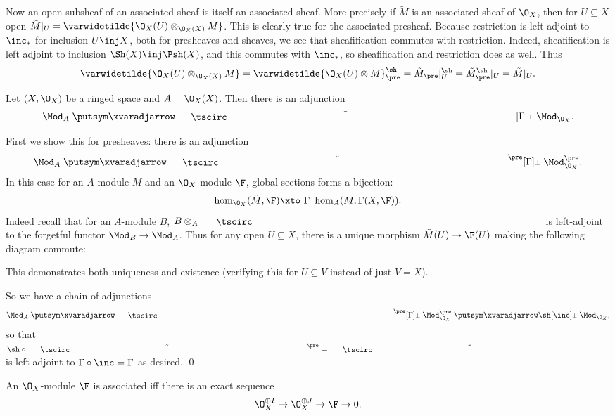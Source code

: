 Now an open subsheaf of an associated sheaf is itself an associated sheaf.
More precisely if $\tilde M$ is an associated sheaf of $\O_X$, then for $U\subseteq X$ open $\tilde M|_U=\varwidetilde{\O_X(U)\otimes_{\O_X(X)}M}$.
This is clearly true for the associated presheaf.
Because restriction is left adjoint to $\inc_*$ for inclusion $U\inj X$, both for presheaves and sheaves, we see that sheafification commutes with restriction.
Indeed, sheafification is left adjoint to inclusion $\Sh(X)\inj\Psh(X)$, and this commutes with $\inc_*$, so sheafification and restriction does as well.
Thus
$$ \varwidetilde{\O_X(U)\otimes_{\O_X(X)}M} = \varwidetilde{\O_X(U)\otimes M}_\pre^\sh = \tilde M_\pre|_U^\sh = \tilde M_\pre^\sh|_U = \tilde M|_U . $$

\bprop

    Let $(X,\O_X)$ be a ringed space and $A=\O_X(X)$.
    Then there is an adjunction
    $$ \Mod_A \adjarrow{\tilde\bul}{\Gamma} \Mod_{\O_X} . $$

\eprop

\bproof

    First we show this for presheaves: there is an adjunction
    $$ \Mod_A \adjarrow{\tilde\bul^\pre}{\Gamma} \Mod^\pre_{\O_X} . $$
    In this case for an $A$-module $M$ and an $\O_X$-module $\F$, global sections forms a bijection:
    $$ \hom_{\O_X}(\tilde M,\F) \xtos\Gamma \hom_A(M,\Gamma(X,\F)) . $$
    Indeed recall that for an $A$-module $B$, $B\otimes_A\bul$ is left-adjoint to the forgetful functor $\Mod_B\to\Mod_A$.
    Thus for any open $U\subseteq X$, there is a unique morphism $\tilde M(U)\to\F(U)$ making the following diagram commute:


    This demonstrates both uniqueness and existence (verifying this for $U\subseteq V$ instead of just $V=X$).

    So we have a chain of adjunctions
    $$ \Mod_A \adjarrow{\tilde\bul^\pre}{\Gamma} \Mod^\pre_{\O_X} \adjarrow{\sh}{\inc} \Mod_{\O_X} , $$
    so that $\sh\circ\tilde\bul^\pre=\tilde\bul$ is left adjoint to $\Gamma\circ\inc=\Gamma$ as desired.
    \qed

\eproof

\blemm

    An $\O_X$-module $\F$ is associated iff there is an exact sequence
    $$ \O_X^{\oplus I} \to \O_X^{\oplus J} \to \F \to 0 . $$

